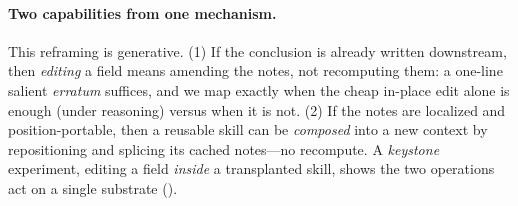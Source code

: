 \paragraph{Two capabilities from one mechanism.} This reframing is generative. (1) If the conclusion is
already written downstream, then \emph{editing} a field means amending the notes, not recomputing them:
a one-line salient \emph{erratum} suffices, and we map exactly when the cheap in-place edit alone is
enough (under reasoning) versus when it is not. (2) If the notes are localized and position-portable,
then a reusable skill can be \emph{composed} into a new context by repositioning and splicing its cached
notes---no recompute. A \emph{keystone} experiment, editing a field \emph{inside} a transplanted skill,
shows the two operations act on a single substrate ().

